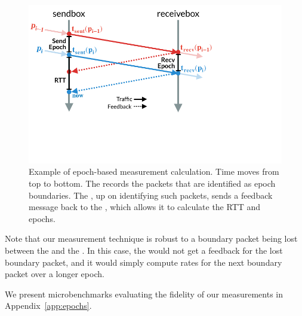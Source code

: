 \begin{figure}
    \centering
    \includegraphics[width=\columnwidth]{img/rate-calculation}
    \caption{Example of epoch-based measurement calculation. Time moves from top to bottom.
    The \inbox records the packets that are identified as epoch boundaries. 
    The \outbox, up on identifying such packets, sends a feedback message back to
    the \inbox, which allows it to calculate the RTT and epochs.
    }\label{fig:ratecalc}
\end{figure}

Note that our measurement technique is robust to a boundary packet being lost between the \inbox and the \outbox. In this case, the \inbox would not get a feedback for the lost boundary packet, and it would simply compute rates for the next boundary packet over a longer epoch. 

We present microbenchmarks evaluating the fidelity of our measurements in Appendix~\ref{app:epochs}.

